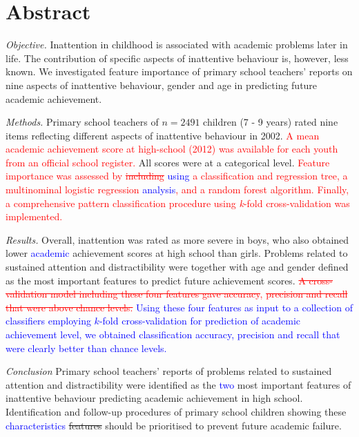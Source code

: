 \documentclass[10pt,letterpaper]{article}
\begin{document}
\section*{Abstract}
\noindent \emph{Objective.}
Inattention in childhood is associated with academic problems later in life. The contribution of specific aspects of inattentive behaviour is, however, less known. We investigated feature importance of primary school teachers' reports on nine aspects of inattentive behaviour, gender and age in predicting future academic achievement. 

\noindent \emph{Methods.} Primary school teachers of $n=2491$ children (7 - 9 years) rated nine items reflecting different aspects of inattentive behaviour in 2002. \textcolor{red}{A mean academic achievement score at high-school (2012) was available for each youth from an official school register.} All scores were at a categorical level. \textcolor{red}{Feature importance was assessed by \sout{including} \textcolor{blue}{using}  a classification and regression tree, a multinominal logistic regression \textcolor{blue}{analysis}, and a random forest algorithm. Finally, a comprehensive pattern classification procedure using {\em k}-fold cross-validation was implemented.}

\noindent \emph{Results.}
Overall, inattention was rated as more severe in boys, who also obtained lower \textcolor{blue}{academic} achievement scores at high school than girls. Problems related to sustained attention and distractibility were together with age and gender defined as the most important features to predict future achievement scores. \textcolor{red}{\sout{A cross-validation model including these four features gave accuracy}, \sout{precision and recall that were above chance levels.} } \textcolor{blue}{Using these four features as input to a collection of  classifiers
employing $k$-fold cross-validation for prediction of academic achievement level, we obtained classification accuracy, precision and recall that were clearly better than chance levels. }

\noindent \emph{Conclusion} 
Primary school teachers' reports of problems related to sustained attention and distractibility were identified as the \textcolor{blue}{two} most important features of inattentive behaviour predicting academic achievement in high school.  Identification and follow-up procedures of primary school children showing these \textcolor{blue}{characteristics} \sout{features} should be prioritised to prevent future academic failure. %
\end{document}
